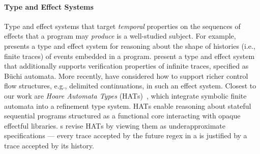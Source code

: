 \paragraph{Type and Effect Systems}
Type and effect systems that target \emph{temporal} properties on the
sequences of effects that a program may \emph{produce} is a
well-studied subject. For example, \citet{SS+04} presents a type and
effect system for reasoning about the shape of histories (i.e., finite
traces) of events embedded in a program.  \citet{KT+14} present a type
and effect system that additionally supports verification properties
of infinite traces, specified as B\"{u}chi automata.  More recently,
\citet{Temporal-Verification} have considered how to support richer
control flow structures, e.g., delimited continuations, in such an
effect system.  Closest to our work are \emph{Hoare Automata Types}
(\textsc{HAT}s)~\cite{ZYDJ24}, which integrate symbolic finite
automata into a refinement type system. \textsc{HAT}s enable reasoning
about stateful sequential programs structured as a functional core
interacting with opaque effectful libraries.  \tyName{}s revise
\textsc{HAT}s by viewing them as underapproximate specifications ---
every trace accepted by the future regex in a \tyName{} is
justified by a trace accepted by its history.

